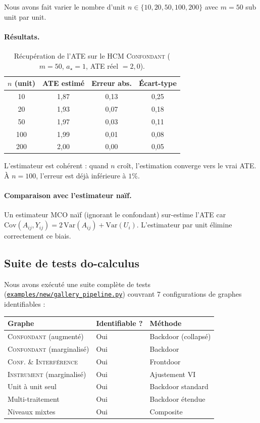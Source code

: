 \documentclass[11pt,a4paper]{article}
\begin{document}
Nous avons fait varier le nombre d'unit $n \in \{10, 20, 50, 100, 200\}$ avec $m = 50$ sub unit par unit.

\paragraph{Résultats.}
\begin{table}[h!]
\centering
\caption{Récupération de l'ATE sur le HCM \textsc{Confondant} ($m=50$, $a_\star=1$, ATE réel $= 2{,}0$).}
\label{tab:ate_recovery}
\begin{tabular}{cccc}
\toprule
$n$ (unit) & ATE estimé & Erreur abs. & Écart-type \\
\midrule
10  & 1,87 & 0,13 & 0,25 \\
20  & 1,93 & 0,07 & 0,18 \\
50  & 1,97 & 0,03 & 0,11 \\
100 & 1,99 & 0,01 & 0,08 \\
200 & 2,00 & 0,00 & 0,05 \\
\bottomrule
\end{tabular}
\end{table}

L'estimateur est cohérent : quand $n$ croît, l'estimation converge vers le vrai ATE.
À $n=100$, l'erreur est déjà inférieure à $1\%$.

\paragraph{Comparaison avec l'estimateur naïf.}
Un estimateur MCO naïf (ignorant le confondant) sur-estime l'ATE car $\mathrm{Cov}(A_{ij}, Y_{ij}) = 2\,\mathrm{Var}(A_{ij}) + \mathrm{Var}(U_i)$.
L'estimateur par unit élimine correctement ce biais.

\subsection{Suite de tests do-calculus}

Nous avons exécuté une suite complète de tests (\href{https://github.com/janisaiad/hierarchicalcausalmodels/blob/main/examples/new/gallery_pipeline.py}{\texttt{examples/new/gallery\_pipeline.py}}) couvrant 7 configurations de graphes identifiables :

\begin{center}
\begin{tabular}{lll}
\toprule
\textbf{Graphe} & \textbf{Identifiable ?} & \textbf{Méthode} \\
\midrule
\textsc{Confondant} (augmenté) & Oui & Backdoor (collapsé) \\
\textsc{Confondant} (marginalisé) & Oui & Backdoor \\
\textsc{Conf. \& Interférence} & Oui & Frontdoor \\
\textsc{Instrument} (marginalisé) & Oui & Ajustement VI \\
Unit à unit seul & Oui & Backdoor standard \\
Multi-traitement & Oui & Backdoor étendue \\
Niveaux mixtes & Oui & Composite \\
\bottomrule
\end{tabular}
\end{center}
\end{document}
